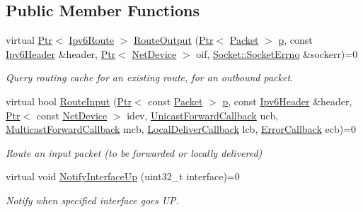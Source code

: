 \subsection*{Public Member Functions}
\begin{DoxyCompactItemize}
\item 
virtual \hyperlink{classns3_1_1Ptr}{Ptr}$<$ \hyperlink{classns3_1_1Ipv6Route}{Ipv6\+Route} $>$ \hyperlink{classns3_1_1Ipv6RoutingProtocol_a92e79a0364ad272392ee635ffe50644d}{Route\+Output} (\hyperlink{classns3_1_1Ptr}{Ptr}$<$ \hyperlink{classns3_1_1Packet}{Packet} $>$ \hyperlink{lte__link__budget__x2__handover__measures_8m_ac9de518908a968428863f829398a4e62}{p}, const \hyperlink{classns3_1_1Ipv6Header}{Ipv6\+Header} \&header, \hyperlink{classns3_1_1Ptr}{Ptr}$<$ \hyperlink{classns3_1_1NetDevice}{Net\+Device} $>$ oif, \hyperlink{classns3_1_1Socket_ada1328c5ae0c28cb2a982caf8f6d6cca}{Socket\+::\+Socket\+Errno} \&sockerr)=0
\begin{DoxyCompactList}\small\item\em Query routing cache for an existing route, for an outbound packet. \end{DoxyCompactList}\item 
virtual bool \hyperlink{classns3_1_1Ipv6RoutingProtocol_a73c66cddf196bf84090305f8d64df33b}{Route\+Input} (\hyperlink{classns3_1_1Ptr}{Ptr}$<$ const \hyperlink{classns3_1_1Packet}{Packet} $>$ \hyperlink{lte__link__budget__x2__handover__measures_8m_ac9de518908a968428863f829398a4e62}{p}, const \hyperlink{classns3_1_1Ipv6Header}{Ipv6\+Header} \&header, \hyperlink{classns3_1_1Ptr}{Ptr}$<$ const \hyperlink{classns3_1_1NetDevice}{Net\+Device} $>$ idev, \hyperlink{classns3_1_1Ipv6RoutingProtocol_a579fd6755ee873009819f7117371fea7}{Unicast\+Forward\+Callback} ucb, \hyperlink{classns3_1_1Ipv6RoutingProtocol_a5f12e04512ce8e5808c3cceff6b8918f}{Multicast\+Forward\+Callback} mcb, \hyperlink{classns3_1_1Ipv6RoutingProtocol_a93f6c06be1e024747e95f4299eba74a6}{Local\+Deliver\+Callback} lcb, \hyperlink{classns3_1_1Ipv6RoutingProtocol_abfdf43594e2ae97e1a4dc340e3a086a5}{Error\+Callback} ecb)=0
\begin{DoxyCompactList}\small\item\em Route an input packet (to be forwarded or locally delivered) \end{DoxyCompactList}\item 
virtual void \hyperlink{classns3_1_1Ipv6RoutingProtocol_a024dd60e2deb864565ba5993efc38300}{Notify\+Interface\+Up} (uint32\+\_\+t interface)=0
\begin{DoxyCompactList}\small\item\em Notify when specified interface goes UP. \end{DoxyCompactList}\item 

\end{DoxyCompactItemize}
